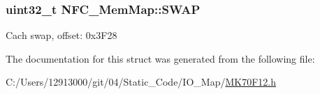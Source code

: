 \subsubsection[{S\+W\+A\+P}]{\setlength{\rightskip}{0pt plus 5cm}uint32\+\_\+t N\+F\+C\+\_\+\+Mem\+Map\+::\+S\+W\+A\+P}\label{struct_n_f_c___mem_map_acb4d1261ff3c34b54bc5c14496f742ac}
Cach swap, offset\+: 0x3\+F28 

The documentation for this struct was generated from the following file\+:\begin{DoxyCompactItemize}
\item 
C\+:/\+Users/12913000/git/04/\+Static\+\_\+\+Code/\+I\+O\+\_\+\+Map/\hyperlink{_m_k70_f12_8h}{M\+K70\+F12.\+h}\end{DoxyCompactItemize}

